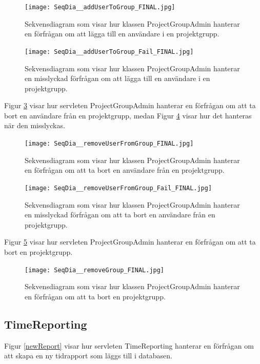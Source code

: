 \documentclass[a4paper]{article}
\begin{document}
\begin{figure}[h!]
\centering
\texttt{[image: SeqDia\_\_addUserToGroup\_FINAL.jpg]}
\caption{Sekvensdiagram som visar hur klassen ProjectGroupAdmin hanterar en förfrågan om att lägga till en användare i en projektgrupp.
\label{addUserToGroup}}
\end{figure}

\begin{figure}[h!]
\centering
\texttt{[image: SeqDia\_\_addUserToGroup\_Fail\_FINAL.jpg]}
\caption{Sekvensdiagram som visar hur klassen ProjectGroupAdmin hanterar en misslyckad förfrågan om att lägga till en användare i en projektgrupp.
\label{addUserToGroupFail}}
\end{figure}

\noindent
Figur \ref{removeUserFromGroup} visar hur servleten ProjectGroupAdmin hanterar en förfrågan om att ta bort en användare från en projektgrupp, medan Figur \ref{removeUserFromGroupFail} visar hur det hanteras när den misslyckas.

\begin{figure}[h!]
\centering
\texttt{[image: SeqDia\_\_removeUserFromGroup\_FINAL.jpg]}
\caption{Sekvensdiagram som visar hur klassen ProjectGroupAdmin hanterar en förfrågan om att ta bort en användare från en projektgrupp.
\label{removeUserFromGroup}}
\end{figure}

\begin{figure}[h!]
\centering
\texttt{[image: SeqDia\_\_removeUserFromGroup\_Fail\_FINAL.jpg]}
\caption{Sekvensdiagram som visar hur klassen ProjectGroupAdmin hanterar en misslyckad förfrågan om att ta bort en användare från en projektgrupp.
\label{removeUserFromGroupFail}}
\end{figure}

\noindent
Figur \ref{removeGroup} visar hur servleten ProjectGroupAdmin hanterar en förfrågan om att ta bort en projektgrupp.

\begin{figure}[h!]
\centering
\texttt{[image: SeqDia\_\_removeGroup\_FINAL.jpg]}
\caption{Sekvensdiagram som visar hur klassen ProjectGroupAdmin hanterar en förfrågan om att ta bort en projektgrupp.
\label{removeGroup}}
\end{figure}

\subsection{TimeReporting}
Figur \ref{newReport} visar hur servleten TimeReporting hanterar en förfrågan om att skapa en ny tidrapport som läggs till i databasen.
\end{document}
